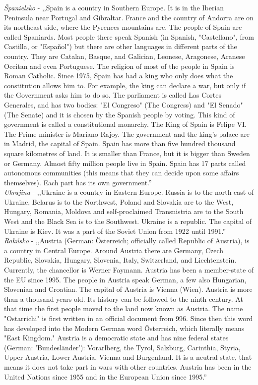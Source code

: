\noindent
\textit{Španielsko} - ,,Spain is a country in Southern Europe. It is in the Iberian Peninsula near Portugal and Gibraltar. France and the country of Andorra are on its northeast side, where the Pyrenees mountains are. The people of Spain are called Spaniards. Most people there speak Spanish (in Spanish, "Castellano", from Castilla, or "Español") but there are other languages in different parts of the country. They are Catalan, Basque, and Galician, Leonese, Aragonese, Aranese Occitan and even Portuguese. The religion of most of the people in Spain is Roman Catholic. Since 1975, Spain has had a king who only does what the constitution allows him to. For example, the king can declare a war, but only if the Government asks him to do so. The parliament is called Las Cortes Generales, and has two bodies: "El Congreso" (The Congress) and "El Senado" (The Senate) and it is chosen by the Spanish people by voting. This kind of government is called a constitutional monarchy. The King of Spain is Felipe VI. The Prime minister is Mariano Rajoy. The government and the king's palace are in Madrid, the capital of Spain. Spain has more than five hundred thousand square kilometres of land. It is smaller than France, but it is bigger than Sweden or Germany. Almost fifty million people live in Spain. Spain has 17 parts called autonomous communities (this means that they can decide upon some affairs themselves). Each part has its own government.'' \\

\noindent
\textit{Ukrajina} - ,,Ukraine is a country in Eastern Europe. Russia is to the north-east of Ukraine, Belarus is to the Northwest, Poland and Slovakia are to the West, Hungary, Romania, Moldova and self-proclaimed Transnistria are to the South West and the Black Sea is to the Southwest. Ukraine is a republic. The capital of Ukraine is Kiev. It was a part of the Soviet Union from 1922 until 1991.'' \\

\noindent
\textit{Rakúsko} - ,,Austria (German: Österreich; officially called Republic of Austria), is a country in Central Europe. Around Austria there are Germany, Czech Republic, Slovakia, Hungary, Slovenia, Italy, Switzerland, and Liechtenstein. Currently, the chancellor is Werner Faymann. Austria has been a member-state of the EU since 1995. The people in Austria speak German, a few also Hungarian, Slovenian and Croatian. The capital of Austria is Vienna (Wien). Austria is more than a thousand years old. Its history can be followed to the ninth century. At that time the first people moved to the land now known as Austria. The name "Ostarrichi" is first written in an official document from 996. Since then this word has developed into the Modern German word Österreich, which literally means "East Kingdom." Austria is a democratic state and has nine federal states (German: 'Bundesländer'): Vorarlberg, the Tyrol, Salzburg, Carinthia, Styria, Upper Austria, Lower Austria, Vienna and Burgenland. It is a neutral state, that means it does not take part in wars with other countries. Austria has been in the United Nations since 1955 and in the European Union since 1995.'' \\


